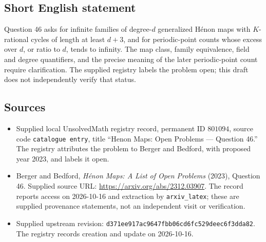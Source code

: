 \documentclass[11pt]{article}
\begin{document}
\subsection{Short English statement}
Question 46 asks for infinite families of degree-\(d\) generalized H\'{e}non maps with \(K\)-rational cycles of length at least \(d+3\), and for periodic-point counts whose excess over \(d\), or ratio to \(d\), tends to infinity. The map class, family equivalence, field and degree quantifiers, and the precise meaning of the later periodic-point count require clarification. The supplied registry labels the problem open; this draft does not independently verify that status.
\subsection{Sources}
\begin{itemize}
\item Supplied local UnsolvedMath registry record, permanent ID \(801094\), source code \texttt{catalogue entry}, title ``Henon Maps: Open Problems --- Question 46.'' The registry attributes the problem to Berger and Bedford, with proposed year 2023, and labels it open.
\item Berger and Bedford, \emph{H\'{e}non Maps: A List of Open Problems} (2023), Question 46. Supplied source URL: \url{https://arxiv.org/abs/2312.03907}. The record reports access on 2026-10-16 and extraction by \texttt{arxiv\_latex}; these are supplied provenance statements, not an independent visit or verification.
\item Supplied upstream revision: \texttt{d371ee917ac9647fbb06cd6fc529deec6f3dda82}. The registry records creation and update on 2026-10-16.
\end{itemize}
\end{document}

